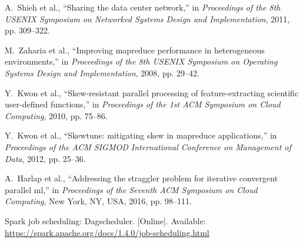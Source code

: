\documentclass[10pt,journal,compsoc]{IEEEtran}
\begin{document}
\begin{thebibliography}{44}
A.~Shieh et al., ``Sharing the data
  center network,'' in \emph{Proceedings of the 8th USENIX Symposium on
  Networked Systems Design and Implementation}, 2011, pp. 309--322.

M.~Zaharia et al., ``Improving
  mapreduce performance in heterogeneous environments,'' in \emph{Proceedings
  of the 8th USENIX Symposium on Operating Systems Design and Implementation},
  2008, pp. 29--42.

Y.~Kwon et al., ``Skew-resistant parallel
  processing of feature-extracting scientific user-defined functions,'' in
  \emph{Proceedings of the 1st ACM Symposium on Cloud Computing}, 2010, pp. 75--86.

Y.~Kwon et al., ``Skewtune: mitigating skew in mapreduce applications,'' in
  \emph{Proceedings of the ACM SIGMOD International Conference on Management of
  Data}, 2012, pp. 25--36.

A.~Harlap et al., ``Addressing the straggler problem for iterative convergent
  parallel ml,'' in \emph{Proceedings of the Seventh ACM Symposium on Cloud
  Computing}, New York, NY, USA, 2016, pp. 98--111.

\BIBentryALTinterwordspacing
Spark job scheduling: Dagscheduler. [Online]. Available:
  \url{https://spark.apache.org/docs/1.4.0/job-scheduling.html}
\BIBentrySTDinterwordspacing

\end{thebibliography}

%
%

% 
\newpage
\end{document}
